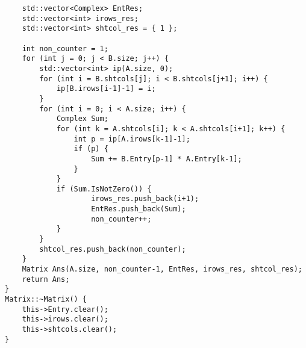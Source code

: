 \documentclass{report}
\begin{document}
\begin{lstlisting}
    std::vector<Complex> EntRes;
    std::vector<int> irows_res;
    std::vector<int> shtcol_res = { 1 };

    int non_counter = 1;
    for (int j = 0; j < B.size; j++) {
        std::vector<int> ip(A.size, 0);
        for (int i = B.shtcols[j]; i < B.shtcols[j+1]; i++) {
            ip[B.irows[i-1]-1] = i;
        }
        for (int i = 0; i < A.size; i++) {
            Complex Sum;
            for (int k = A.shtcols[i]; k < A.shtcols[i+1]; k++) {
                int p = ip[A.irows[k-1]-1];
                if (p) {
                    Sum += B.Entry[p-1] * A.Entry[k-1];
                }
            }
            if (Sum.IsNotZero()) {
                    irows_res.push_back(i+1);
                    EntRes.push_back(Sum);
                    non_counter++;
            }
        }
        shtcol_res.push_back(non_counter);
    }
    Matrix Ans(A.size, non_counter-1, EntRes, irows_res, shtcol_res);
    return Ans;
}
Matrix::~Matrix() {
    this->Entry.clear();
    this->irows.clear();
    this->shtcols.clear();
}

\end{lstlisting}
\end{document}
